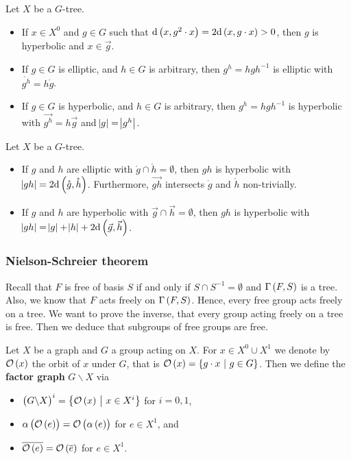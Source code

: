 \begin{exercise}
Let $ X $ be a $ G $-tree.
\begin{itemize}
\item If $ x \in X^0 $ and $ g \in G $ such that $ \d\br{x, g^2 \cdot x} = 2\d\br{x, g \cdot x} > 0 $, then $ g $ is hyperbolic and $ x \in \vec{g} $.
\item If $ g \in G $ is elliptic, and $ h \in G $ is arbitrary, then $ g^h = hgh^{-1} $ is elliptic with $ \mathring{g^h} = h\mathring{g} $.
\item If $ g \in G $ is hyperbolic, and $ h \in G $ is arbitrary, then $ g^h = hgh^{-1} $ is hyperbolic with $ \vec{g^h} = h\vec{g} $ and $ \abs{g} = \abs{g^h} $.
\end{itemize}
\end{exercise}

\begin{proposition}
Let $ X $ be a $ G $-tree.
\begin{itemize}
\item If $ g $ and $ h $ are elliptic with $ \mathring{g} \cap \mathring{h} = \emptyset $, then $ gh $ is hyperbolic with $ \abs{gh} = 2\d\br{\mathring{g}, \mathring{h}} $. Furthermore, $ \vec{gh} $ intersects $ \mathring{g} $ and $ \mathring{h} $ non-trivially.
\item If $ g $ and $ h $ are hyperbolic with $ \vec{g} \cap \vec{h} = \emptyset $, then $ gh $ is hyperbolic with $ \abs{gh} = \abs{g} + \abs{h} + 2\d\br{\vec{g}, \vec{h}} $.
\end{itemize}
\end{proposition}

\subsubsection{Nielson-Schreier theorem}

Recall that $ F $ is free of basis $ S $ if and only if $ S \cap S^{-1} = \emptyset $ and $ \Gamma\br{F, S} $ is a tree. Also, we know that $ F $ acts freely on $ \Gamma\br{F, S} $. Hence, every free group acts freely on a tree. We want to prove the inverse, that every group acting freely on a tree is free. Then we deduce that subgroups of free groups are free.

\begin{definition}
Let $ X $ be a graph and $ G $ a group acting on $ X $. For $ x \in X^0 \cup X^1 $ we denote by $ \OOO\br{x} $ the orbit of $ x $ under $ G $, that is $ \OOO\br{x} = \cbr{g \cdot x \st g \in G} $. Then we define the \textbf{factor graph} $ G \backslash X $ via
\begin{itemize}
\item $ \br{G \backslash X}^i = \cbr{\OOO\br{x} \st x \in X^i} $ for $ i = 0, 1 $,
\item $ \alpha\br{\OOO\br{e}} = \OOO\br{\alpha\br{e}} $ for $ e \in X^1 $, and
\item $ \overline{\OOO\br{e}} = \OOO\br{\overline{e}} $ for $ e \in X^1 $.
\end{itemize}
\end{definition}

